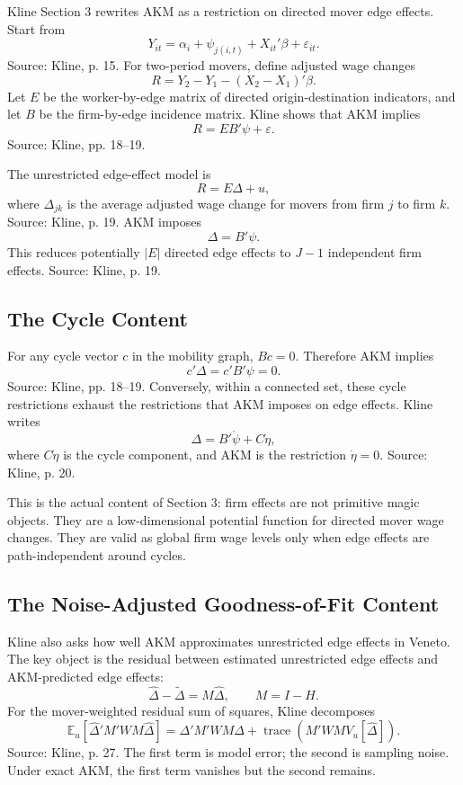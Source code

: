\documentclass[11pt]{article}
\newcommand{\E}{\mathbb{E}}
\begin{document}
Kline Section 3 rewrites AKM as a restriction on directed mover edge effects. Start
from
\[
Y_{it}=\alpha_i+\psi_{j(i,t)}+X_{it}'\beta+\varepsilon_{it}.
\]
Source: Kline, p. 15. For two-period movers, define adjusted wage changes
\[
R=Y_2-Y_1-(X_2-X_1)'\beta.
\]
Let $E$ be the worker-by-edge matrix of directed origin-destination indicators,
and let $B$ be the firm-by-edge incidence matrix. Kline shows that AKM implies
\[
R=EB'\psi+\varepsilon.
\]
Source: Kline, pp. 18--19.

The unrestricted edge-effect model is
\[
R=E\Delta+u,
\]
where $\Delta_{jk}$ is the average adjusted wage change for movers from firm $j$
to firm $k$. Source: Kline, p. 19. AKM imposes
\[
\Delta=B'\psi.
\]
This reduces potentially $|E|$ directed edge effects to $J-1$ independent firm
effects. Source: Kline, p. 19.

\subsection{The Cycle Content}

For any cycle vector $c$ in the mobility graph, $Bc=0$. Therefore AKM implies
\[
c'\Delta=c'B'\psi=0.
\]
Source: Kline, pp. 18--19. Conversely, within a connected set, these cycle
restrictions exhaust the restrictions that AKM imposes on edge effects. Kline
writes
\[
\Delta=B'\dot\psi+C\dot\eta,
\]
where $C\dot\eta$ is the cycle component, and AKM is the restriction
$\dot\eta=0$. Source: Kline, p. 20.

This is the actual content of Section 3: firm effects are not primitive magic
objects. They are a low-dimensional potential function for directed mover wage
changes. They are valid as global firm wage levels only when edge effects are
path-independent around cycles.

\subsection{The Noise-Adjusted Goodness-of-Fit Content}

Kline also asks how well AKM approximates unrestricted edge effects in Veneto.
The key object is the residual between estimated unrestricted edge effects and
AKM-predicted edge effects:
\[
\hat\Delta-\tilde\Delta=M\hat\Delta,
\qquad M=I-H.
\]
For the mover-weighted residual sum of squares, Kline decomposes
\[
\E_u[\hat\Delta'M'WM\hat\Delta]
=
\Delta'M'WM\Delta
+\operatorname{trace}\!\left(M'WMV_u[\hat\Delta]\right).
\]
Source: Kline, p. 27. The first term is model error; the second is sampling noise.
Under exact AKM, the first term vanishes but the second remains.
\end{document}
